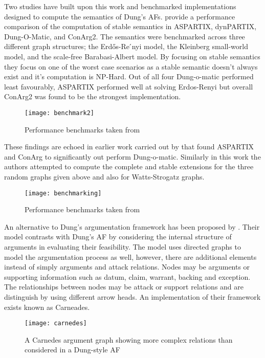 Two studies have built upon this work and benchmarked implementations designed to compute the semantics of Dung's AFs. \cite{bistarelli2014benchmarking} provide a performance comparison of the computation of stable semantics in ASPARTIX, dynPARTIX, Dung-O-Matic, and ConArg2. The semantics were benchmarked across three different graph structures; the Erdős-Re ́nyi model, the Kleinberg small-world model, and the scale-free Barabasi-Albert model. By focusing on stable semantics they focus on one of the worst case scenarios as a stable semantic doesn't always exist and it's computation is NP-Hard. Out of all four Dung-o-matic performed least favourably, ASPARTIX performed well at solving Erdos-Renyi but overall ConArg2 was found to be the strongest implementation.

\begin{figure}[!h]
\centering
\texttt{[image: benchmark2]}
\caption{Performance benchmarks taken from \cite{bistarelli2014benchmarking}}
\label{fig:my_label}
\end{figure}

These findings are echoed in earlier work carried out by \cite{bistarelli2013first} that found ASPARTIX and ConArg to significantly out perform Dung-o-matic. Similarly in this work the authors attempted to compute the complete and stable extensions for the three random graphs given above and also for Watts-Strogatz graphs. 

\begin{figure}[!h]
\centering
\texttt{[image: benchmarking]}
\caption{Performance benchmarks taken from \cite{bistarelli2013first}}
\label{fig:my_label}
\end{figure}

An alternative to Dung's argumentation framework has been proposed by \cite{gordon2007carneades}. Their model contrasts with Dung's AF by considering the internal structure of arguments in evaluating their feasibility. The model uses directed graphs to model the argumentation process as well, however, there are additional elements instead of simply arguments and attack relations. Nodes may be arguments or supporting information such as datum, claim, warrant, backing and exception. The relationships between nodes may be attack or support relations and are distinguish by using different arrow heads. An implementation of their framework exists known as Carneades.

\begin{figure}[!h]
\centering
\texttt{[image: carnedes]}
\caption{A Carnedes argument graph showing more complex relations than considered in a Dung-style AF}
\label{fig:my_label}
\end{figure}

